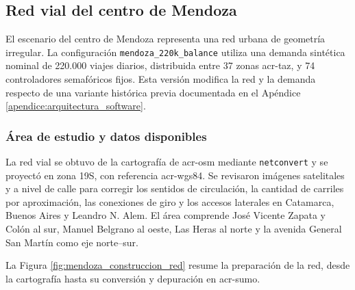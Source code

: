 \subsection{Red vial del centro de Mendoza}
\label{subsec:escenario_mendoza}

El escenario del centro de Mendoza representa una red urbana de geometría irregular. La configuración \texttt{mendoza\_220k\_balance} utiliza una demanda sintética nominal de 220.000 viajes diarios, distribuida entre 37 zonas \acrshort{acr-taz}, y 74 controladores semafóricos fijos. Esta versión modifica la red y la demanda respecto de una variante histórica previa documentada en el Apéndice \ref{apendice:arquitectura_software}.

\subsubsection{Área de estudio y datos disponibles}
\label{subsubsec:mendoza_dominio_datos}

La red vial se obtuvo de la cartografía de \acrshort{acr-osm} mediante \texttt{netconvert} y se proyectó en  zona 19S, con referencia \acrfull{acr-wgs84}. Se revisaron imágenes satelitales y a nivel de calle para corregir los sentidos de circulación, la cantidad de carriles por aproximación, las conexiones de giro y los accesos laterales en Catamarca, Buenos Aires y Leandro N. Alem. El área comprende José Vicente Zapata y Colón al sur, Manuel Belgrano al oeste, Las Heras al norte y la avenida General San Martín como eje norte--sur.

La Figura \ref{fig:mendoza_construccion_red} resume la preparación de la red, desde la cartografía hasta su conversión y depuración en \acrshort{acr-sumo}.

